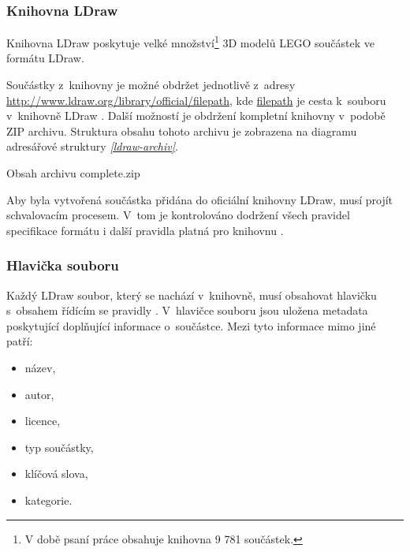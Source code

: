     \subsubsection*{Knihovna LDraw}\label{ldraw-knihovna}
    Knihovna LDraw poskytuje velké množství\footnote{V době psaní práce obsahuje knihovna 9 781 součástek.} 3D modelů LEGO součástek ve formátu LDraw.

    Součástky z~knihovny je možné obdržet jednotlivě z~adresy \url{http://www.ldraw.org/library/official/filepath}, kde \url{filepath} je cesta k~souboru v~knihovně LDraw \autocite{ldraw:download}. Další možností je obdržení kompletní knihovny v~podobě ZIP archivu. Struktura obsahu tohoto archivu je zobrazena na diagramu adresářové struktury \emph{\ref{ldraw-archiv}}.

    \begin{dirfigure}%
        \caption{Obsah archivu complete.zip}\label{ldraw-archiv}
    \end{dirfigure}

    Aby byla vytvořená součástka přidána do oficiální knihovny LDraw, musí projít schvalovacím procesem. V~tom je kontrolováno dodržení všech pravidel specifikace formátu \autocite{ldraw:file:specification} i další pravidla platná pro knihovnu \cite{ldraw:library:restrictions}.

    \subsubsection*{Hlavička souboru}\label{ldraw-hlavicka}
        Každý LDraw soubor, který se nachází v~knihovně, musí obsahovat hlavičku s~obsahem řídícím se pravidly \autocite{ldraw:header:specification}. V~hlavičce souboru jsou uložena metadata poskytující doplňující informace o~součástce. Mezi tyto informace mimo jiné patří:
        \begin{itemize}
            \item název,
            \item autor,
            \item licence,
            \item typ součástky,
            \item klíčová slova,
            \item kategorie.
        \end{itemize}
 
